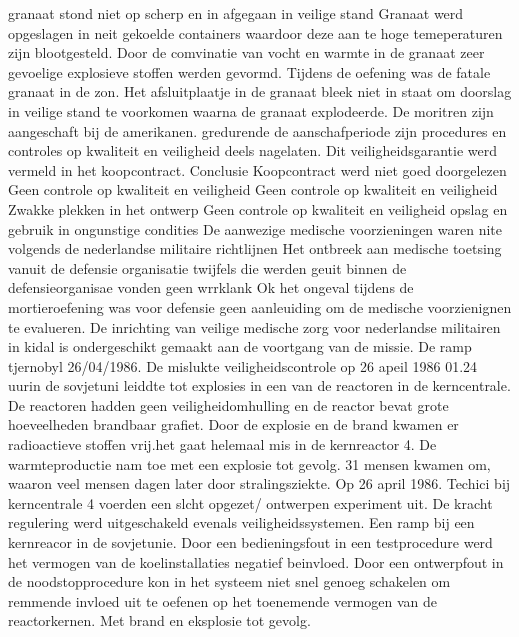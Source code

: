 granaat stond niet op scherp en in afgegaan in veilige stand
Granaat werd opgeslagen in neit gekoelde containers waardoor deze aan te hoge temeperaturen zijn blootgesteld.
Door de comvinatie van vocht en warmte in de granaat zeer gevoelige explosieve stoffen werden gevormd.
Tijdens de oefening was de fatale granaat in de zon.
Het afsluitplaatje in de granaat bleek niet in staat om doorslag in veilige stand te voorkomen waarna de granaat explodeerde.
De moritren zijn aangeschaft bij de amerikanen. gredurende de aanschafperiode zijn procedures en controles op kwaliteit en veiligheid deels nagelaten.
Dit veiligheidsgarantie werd vermeld in het koopcontract.
Conclusie
Koopcontract werd niet goed doorgelezen
Geen controle op kwaliteit en veiligheid
Geen controle op kwaliteit en veiligheid
Zwakke plekken in het ontwerp
Geen controle op kwaliteit en veiligheid
opslag en gebruik in ongunstige condities
De aanwezige medische voorzieningen waren nite volgends de nederlandse militaire richtlijnen
Het ontbreek aan medische toetsing vanuit de defensie organisatie
twijfels die werden geuit binnen de defensieorganisae vonden geen wrrklank
Ok het ongeval tijdens de mortieroefening was voor defensie geen aanleuiding om de medische voorzienignen te evalueren.
De inrichting van veilige medische zorg voor nederlandse militairen in kidal is ondergeschikt gemaakt aan de voortgang van de missie.
\cite{ovvMortierOngevalMaliVideo} 
\cite{bnnvara13062018malirapport}
\cite{eucal11012021malimissieverlengd}
\cite{nos21052014zorgenmalimissie}
\cite{meijnders}
\cite{bnrwebredactie}
\cite{keultjes01062016malimissiecoalitie}
\cite{veenhof18012019}
\cite{isitman06012016militair}
\cite{nporadio11072016filmdemissie}
\cite{parlementairmonitor15122013mortierongeluk}
\newline \indent De ramp tjernobyl 26/04/1986. \cite{INSAVienna1992Chernobyl}
De mislukte veiligheidscontrole op 26 apeil 1986 01.24 uurin de sovjetuni leiddte tot explosies in een van de reactoren in de kerncentrale. De reactoren hadden geen veiligheidomhulling en de reactor bevat grote hoeveelheden brandbaar grafiet.
Door de explosie en de brand kwamen er radioactieve stoffen vrij.het gaat helemaal mis in de kernreactor 4. De warmteproductie nam  toe met een explosie tot gevolg.
31 mensen kwamen om, waaron veel mensen dagen later door stralingsziekte.
 Op 26 april 1986. Techici bij kerncentrale 4 voerden een slcht opgezet/ ontwerpen experiment uit. De  kracht regulering werd uitgeschakeld evenals veiligheidssystemen. 
Een ramp bij een kernreacor in de sovjetunie. Door een bedieningsfout in een testprocedure werd het vermogen van de koelinstallaties negatief beinvloed. Door een ontwerpfout in de noodstopprocedure kon in het systeem niet snel genoeg schakelen om remmende invloed uit te oefenen op het toenemende vermogen van de reactorkernen. Met brand en eksplosie tot gevolg.
